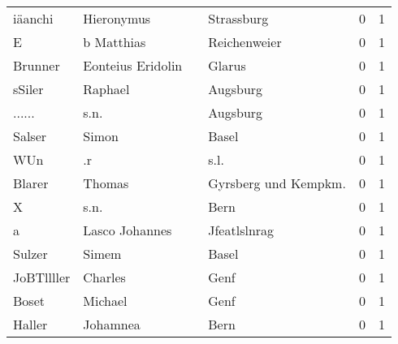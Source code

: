 \documentclass[10pt,a4paper,landscape]{article}
\begin{document}
\begin{longtable}{llllrr}
                  iäanchi &                         Hieronymus &             &                                  Strassburg &          0 &         1 \\
                        E &                         b Matthias &             &                                Reichenweier &          0 &         1 \\
                  Brunner &                  Eonteius Eridolin &             &                                      Glarus &          0 &         1 \\
                   sSiler &                            Raphael &             &                                    Augsburg &          0 &         1 \\
                   ...... &                               s.n. &             &                                    Augsburg &          0 &         1 \\
                   Salser &                              Simon &             &                                       Basel &          0 &         1 \\
                      WUn &                                 .r &             &                                        s.l. &          0 &         1 \\
                   Blarer &                             Thomas &             &                       Gyrsberg und Kempkm.  &          0 &         1 \\
                        X &                               s.n. &             &                                        Bern &          0 &         1 \\
                        a &                     Lasco Johannes &             &                                Jfeatlslnrag &          0 &         1 \\
                   Sulzer &                              Simem &             &                                       Basel &          0 &         1 \\
               JoBTllller &                            Charles &             &                                        Genf &          0 &         1 \\
                    Boset &                            Michael &             &                                        Genf &          0 &         1 \\
                   Haller &                           Johamnea &             &                                        Bern &          0 &         1 \\

\end{longtable}
\end{document}
